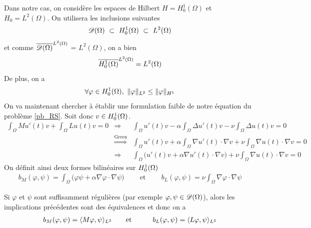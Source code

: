 Dans notre cas, on considère les espaces de Hilbert $H=H^1_0(\Omega)$ et $H_0=L^2(\Omega)$. On utilisera les inclusions suivantes
\begin{equation*}
    \mathscr{D}(\Omega) \ \subset \ H^1_0(\Omega) \ \subset \ L^2(\Omega)
\end{equation*}
et comme $\overline{\mathscr{D}(\Omega)}^{L^2(\Omega)}$ = $L^2(\Omega)$, on a bien 
\begin{equation*}
    \overline{H^1_0(\Omega)}^{L^2(\Omega)} = L^2(\Omega)
\end{equation*}
De plus, on a 
\begin{equation*}
    \forall \varphi \in H^1_0(\Omega), \ \|\varphi\|_{L^2} \leq \|\varphi\|_{H^1}
\end{equation*}
On va maintenant chercher à établir une formulation faible de notre équation du problème \eqref{pb_RS}. Soit donc $v \in H^1_0(\Omega)$.
\begin{eqnarray*}
    \int_{\Omega}Mu'(t)v + \int_{\Omega} Lu(t)v =0 &\Longrightarrow&
    \int_{\Omega} u'(t)v - \alpha \int_{\Omega} \Delta u'(t)v - \nu \int_{\Omega}
    \Delta u(t)v = 0 \\
    &\overset{\text{Green}}{\Longrightarrow}& \int_{\Omega} u'(t)v + \alpha \int_{\Omega} \nabla u'(t)\cdot\nabla v + \nu \int_{\Omega}
    \nabla u(t)\cdot \nabla v = 0 \\
    &\Longrightarrow& \int_{\Omega} \big(u'(t)v+\alpha\nabla u'(t)\cdot\nabla v\big)
    + \nu\int_{\Omega} \nabla u(t)\cdot \nabla v = 0
\end{eqnarray*}
On définit ainsi deux formes bilinéaires sur $H^1_0(\Omega)$
\begin{eqnarray*}
    b_M(\varphi, \psi) = \int_{\Omega} \big(\varphi\psi+\alpha\nabla \varphi\cdot\nabla \psi\big) \ \ \ \ \ &\text{ et }& \ \ \ \ \
    b_L(\varphi, \psi) = \nu\int_{\Omega} \nabla \varphi\cdot \nabla \psi
\end{eqnarray*}

\begin{remark}
    Si $\varphi$ et $\psi$ sont suffisamment régulières (par exemple $\varphi, \psi \in \mathscr{D}(\Omega)$), alors les implications précédentes sont des équivalences et donc on a
    \begin{eqnarray*}
        b_M(\varphi,\psi) = \ps{M\varphi}{\psi}_{L^2} \ \ \ \ \ &\text{ et }& \ \ \ \ \ b_L(\varphi,\psi) = \ps{L\varphi}{\psi}_{L^2}
    \end{eqnarray*}
\end{remark}

